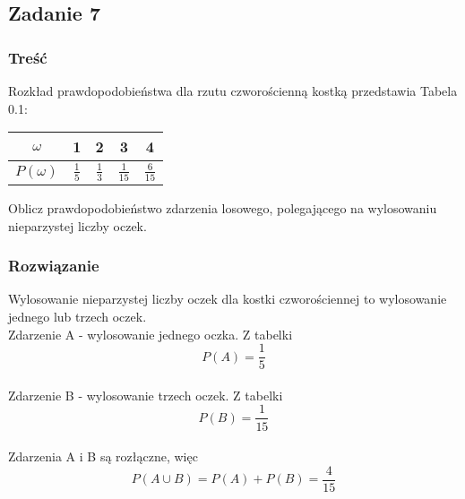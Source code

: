 \subsection{Zadanie 7}

\subsubsection*{Treść}
Rozkład prawdopodobieństwa dla rzutu czworościenną kostką przedstawia Tabela 0.1:

\begin{center}
\begin{tabular}{|c|c|c|c|c|} \hline
$\omega$ &1 & 2 & 3 & 4\\ \hline
$P(\omega)$ & $\frac{1}{5}$ & $\frac{1}{3}$ & $\frac{1}{15}$ & $\frac{6}{15}$ \\ \hline
\end{tabular}
\end{center}

Oblicz prawdopodobieństwo zdarzenia losowego, polegającego na wylosowaniu nieparzystej liczby oczek.


\subsubsection*{Rozwiązanie}
Wylosowanie nieparzystej liczby oczek dla kostki czworościennej to wylosowanie jednego lub trzech oczek. \\
Zdarzenie A - wylosowanie jednego oczka. Z tabelki 
\[ P(A)=\frac{1}{5} \] \\
Zdarzenie B - wylosowanie trzech oczek. Z tabelki 
\[ P(B)=\frac{1}{15} \] \\
Zdarzenia A i B są rozłączne, więc
 \[ P(A{\cup}B) = P(A) + P(B) = \frac{4}{15} \] \\


